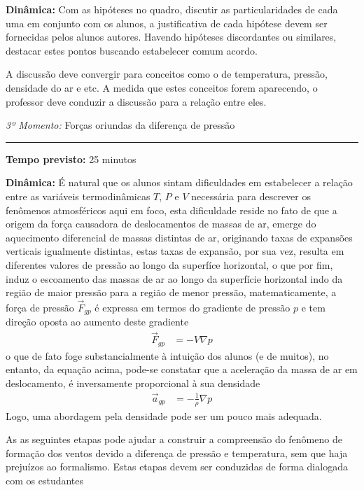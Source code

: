 \documentclass[
12pt,				%
openright,			%
oneside,			%
a4paper,			%
chapter=TITLE,		%
english,			%
brazil				%
]{abntex2}
\begin{document}
\noindent\textbf{Dinâmica:} Com as hipóteses no quadro, discutir as particularidades de cada uma em conjunto com os alunos, a justificativa de cada hipótese devem ser fornecidas pelos alunos autores. Havendo hipóteses discordantes ou similares, destacar estes pontos buscando estabelecer comum acordo.

A discussão deve convergir para conceitos como o de temperatura, pressão, densidade do ar e etc. A medida que estes conceitos forem aparecendo, o professor deve conduzir a discussão para a relação entre eles. 


\vspace{50pt}
\noindent\emph{3º Momento:} Forças oriundas da diferença de pressão
\par\noindent\rule{.3\textwidth}{.5pt}
\par\noindent\textbf{Tempo previsto:} 25 minutos
\par\noindent\textbf{Dinâmica:} É natural que os alunos sintam dificuldades em estabelecer a relação entre as variáveis termodinâmicas $T$, $P$ e $V$ necessária para descrever os fenômenos atmosféricos aqui em foco, esta dificuldade reside no fato de que a origem da força causadora de deslocamentos de massas de ar, emerge do aquecimento diferencial de massas distintas de ar, originando taxas de expansões verticais igualmente distintas, estas taxas de expansão, por sua vez, resulta em diferentes valores de pressão ao longo da superfíce horizontal, o que por fim, induz o escoamento das massas de ar ao longo da superfície horizontal indo da região de maior pressão para a região de menor pressão, matematicamente, a força de pressão $\vec{F}_{gp}$ é expressa em termos do gradiente de pressão $p$ e tem direção oposta ao aumento deste gradiente
\begin{align}
	\vec{F}_{gp} &= -V\nabla p
\end{align}
o que de fato foge substancialmente à intuição dos alunos (e de muitos), no entanto, da equação acima, pode-se constatar que a aceleração da massa de ar em deslocamento, é inversamente proporcional à sua densidade
\begin{align}
	\vec{a}_{gp} &= -\frac{1}{\rho}\nabla p
\end{align}
Logo, uma abordagem pela densidade pode ser um pouco mais adequada.

As as seguintes etapas pode ajudar a construir a compreensão do fenômeno de formação dos ventos devido a diferença de pressão e temperatura, sem que haja prejuízos ao formalismo. Estas etapas devem ser conduzidas de forma dialogada com os estudantes
\end{document}

